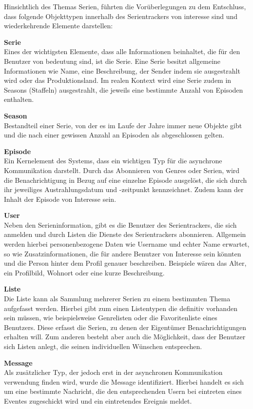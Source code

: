 Hinsichtlich des Themas Serien, führten die Vorüberlegungen zu dem Entschluss, dass folgende Objekttypen innerhalb des Serientrackers von interesse sind und wiederkehrende Elemente darstellen:

\textbf{Serie} \\
Eines der wichtigsten Elemente, dass alle Informationen beinhaltet, die für den Benutzer von bedeutung sind, ist die Serie.
Eine Serie besitzt allgemeine Informationen wie Name, eine Beschreibung, der Sender indem sie ausgestrahlt wird oder das Produktionsland.
Im realen Kontext wird eine Serie zudem in Seasons (Staffeln) ausgestrahlt, die jeweils eine bestimmte Anzahl von Episoden enthalten.

\textbf{Season} \\
Bestandteil einer Serie, von der es im Laufe der Jahre immer neue Objekte gibt und die nach einer gewissen Anzahl an Episoden als abgeschlossen gelten.

\textbf{Episode} \\
Ein Kernelement des Systems, dass ein wichtigen Typ für die asynchrone Kommunikation darstellt. Durch das Abonnieren von Genres oder Serien, wird die Benachrichtigung in Bezug auf eine einzelne Episode ausgelöst, die sich durch ihr jeweiliges Austrahlungsdatum und -zeitpunkt kennzeichnet.
Zudem kann der Inhalt der Episode von Interesse sein.

\textbf{User} \\
Neben den Serieninformation, gibt es die Benutzer des Serientrackers, die sich anmelden und durch Listen die Dienste des Serientrackers abonnieren.
Allgemein werden hierbei personenbezogene Daten wie Username und echter Name erwartet, so wie Zusatzinformationen, die für andere Benutzer von Interesse sein könnten und die Person hinter dem Profil genauer beschreiben. Beispiele wären das Alter, ein Profilbild, Wohnort oder eine kurze Beschreibung.

\textbf{Liste} \\
Die Liste kann als Sammlung mehrerer Serien zu einem bestimmten Thema aufgefasst werden. Hierbei gibt zum einen Listentypen die definitiv vorhanden sein müssen, wie beispielsweise Genrelisten oder die Favoritenliste eines Benutzers. Diese erfasst die Serien, zu denen der Eigentümer Benachrichtigungen erhalten will. Zum anderen besteht aber auch die Möglichkeit, dass der Benutzer sich Listen anlegt, die seinen individuellen Wünschen entsprechen.

\textbf{Message} \\
Als zusätzlicher Typ, der jedoch erst in der asynchronen Kommunikation verwendung finden wird, wurde die Message identifiziert. Hierbei handelt es sich um eine bestimmte Nachricht, die den entsprechenden Usern bei eintreten eines Eventes zugeschickt wird und ein eintretendes Ereignis meldet.



